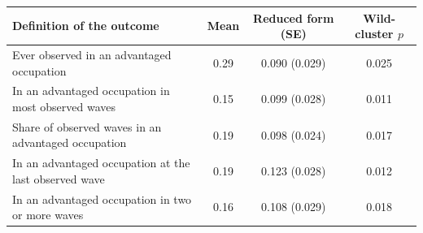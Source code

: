 \begin{tabular}{@{}p{8.2cm}ccc@{}}
\toprule
Definition of the outcome & Mean & Reduced form (SE) & Wild-cluster $p$ \\
\midrule
Ever observed in an advantaged occupation & 0.29 & 0.090 (0.029) & 0.025 \\
In an advantaged occupation in most observed waves & 0.15 & 0.099 (0.028) & 0.011 \\
Share of observed waves in an advantaged occupation & 0.19 & 0.098 (0.024) & 0.017 \\
In an advantaged occupation at the last observed wave & 0.19 & 0.123 (0.028) & 0.012 \\
In an advantaged occupation in two or more waves & 0.16 & 0.108 (0.029) & 0.018 \\
\bottomrule
\end{tabular}
